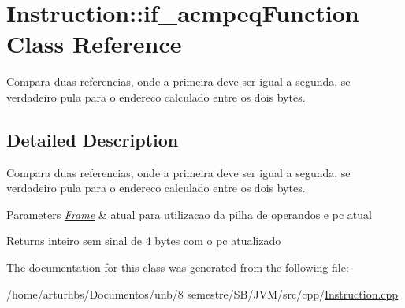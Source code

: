\hypertarget{classInstruction_1_1if__acmpeqFunction}{}\section{Instruction\+:\+:if\+\_\+acmpeq\+Function Class Reference}
\label{classInstruction_1_1if__acmpeqFunction}


Compara duas referencias, onde a primeira deve ser igual a segunda, se verdadeiro pula para o endereco calculado entre os dois bytes.  




\subsection{Detailed Description}
Compara duas referencias, onde a primeira deve ser igual a segunda, se verdadeiro pula para o endereco calculado entre os dois bytes. 


\begin{DoxyParams}{Parameters}
{\em \hyperlink{classFrame}{Frame}} & atual para utilizacao da pilha de operandos e pc atual \\
\hline
\end{DoxyParams}
\begin{DoxyReturn}{Returns}
inteiro sem sinal de 4 bytes com o pc atualizado 
\end{DoxyReturn}


The documentation for this class was generated from the following file\+:\begin{DoxyCompactItemize}
\item 
/home/arturhbs/\+Documentos/unb/8 semestre/\+S\+B/\+J\+V\+M/src/cpp/\hyperlink{Instruction_8cpp}{Instruction.\+cpp}\end{DoxyCompactItemize}
